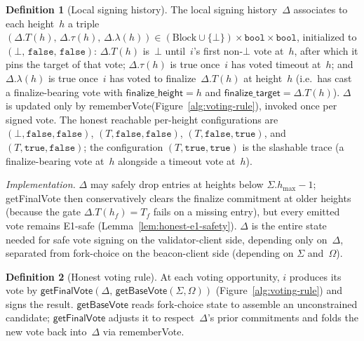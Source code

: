 \ifx\litemode\undefined\documentclass{article}\fi
\newcommand{\finalizeHeight}{\mathsf{finalize\_height}}
\newcommand{\finalizeTarget}{\mathsf{finalize\_target}}
\newcommand{\hmax}{\ensuremath{h_{\max}}\xspace}
\newcommand{\getBaseVote}{\textsf{getBaseVote}\xspace}
\newcommand{\getFinalVote}{\textsf{getFinalVote}\xspace}
\newcommand{\rememberVote}{\textsf{rememberVote}\xspace}
\theoremstyle{plain}
\theoremstyle{definition}
\newtheorem{definition}{Definition}
\theoremstyle{remark}
\begin{document}
\begin{definition}[Local signing history]\label{def:signinghistory}
The local signing history~$\Delta$ associates to each height~$h$ a triple $(\Delta.T(h),\, \Delta.\tau(h),\, \Delta.\lambda(h)) \in (\mathrm{Block} \cup \{\bot\}) \times \mathtt{bool} \times \mathtt{bool}$, initialized to $(\bot,\, \mathtt{false},\, \mathtt{false})$:
$\Delta.T(h)$ is~$\bot$ until~$i$'s first non-$\bot$ vote at~$h$, after which it pins the target of that vote; $\Delta.\tau(h)$ is true once~$i$ has voted timeout at~$h$; and $\Delta.\lambda(h)$ is true once~$i$ has voted to finalize~$\Delta.T(h)$ at height~$h$ (i.e.\ has cast a finalize-bearing vote with $\finalizeHeight = h$ and $\finalizeTarget = \Delta.T(h)$).
$\Delta$ is updated only by \rememberVote (Figure~\ref{alg:voting-rule}), invoked once per signed vote.
The honest reachable per-height configurations are $(\bot, \mathtt{false}, \mathtt{false})$, $(T, \mathtt{false}, \mathtt{false})$, $(T, \mathtt{false}, \mathtt{true})$, and $(T, \mathtt{true}, \mathtt{false})$; the configuration $(T, \mathtt{true}, \mathtt{true})$ is the slashable trace (a finalize-bearing vote at~$h$ alongside a timeout vote at~$h$).

\smallskip
\noindent\emph{Implementation.}
$\Delta$ may safely drop entries at heights below $\Sigma.\hmax - 1$; \getFinalVote then conservatively clears the finalize commitment at older heights (because the gate $\Delta.T(h_f) = T_f$ fails on a missing entry), but every emitted vote remains E1-safe (Lemma~\ref{lem:honest-e1-safety}).
$\Delta$ is the entire state needed for safe vote signing on the validator-client side, depending only on~$\Delta$, separated from fork-choice on the beacon-client side (depending on $\Sigma$ and~$\Omega$).
\end{definition}

\begin{definition}[Honest voting rule]\label{def:voting-rule}
At each voting opportunity, $i$ produces its vote by $\getFinalVote(\Delta,\, \getBaseVote(\Sigma, \Omega))$ (Figure~\ref{alg:voting-rule}) and signs the result.
$\getBaseVote$ reads fork-choice state to assemble an unconstrained candidate; $\getFinalVote$ adjusts it to respect~$\Delta$'s prior commitments and folds the new vote back into~$\Delta$ via \rememberVote.
\end{definition}
\end{document}
